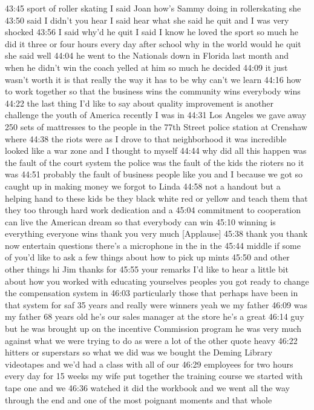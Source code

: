 \documentclass[
]{book}
\begin{document}
43:45
sport of roller skating I said Joan how's Sammy doing in rollerskating she
43:50
said I didn't you hear I said hear what she said he quit and I was very shocked
43:56
I said why'd he quit I said I know he loved the sport so much he did it three or four hours every day after school why in the world would he quit she said well
44:04
he went to the Nationals down in Florida last month and when he didn't win the coach yelled at him so much he decided
44:09
it just wasn't worth it is that really the way it has to be why can't we learn
44:16
how to work together so that the business wins the community wins everybody wins
44:22
the last thing I'd like to say about quality improvement is another challenge the youth of America recently I was in
44:31
Los Angeles we gave away 250 sets of mattresses to the people in the 77th Street police station at Crenshaw where
44:38
the riots were as I drove to that neighborhood it was incredible looked like a war zone and I thought to myself
44:44
why did all this happen was the fault of the court system the police was the fault of the kids the rioters no it was
44:51
probably the fault of business people like you and I because we got so caught up in making money we forgot to Linda
44:58
not a handout but a helping hand to these kids be they black white red or yellow and teach them that they too through hard work dedication and a
45:04
commitment to cooperation can live the American dream so that everybody can win
45:10
winning is everything everyone wins thank you very much {[}Applause{]}
45:38
thank you thank now entertain questions there's a microphone in the in the
45:44
middle if some of you'd like to ask a few things about how to pick up mints
45:50
and other other things hi Jim thanks for
45:55
your remarks I'd like to hear a little bit about how you worked with educating yourselves peoples you got ready to change the compensation system in
46:03
particularly those that perhaps have been in that system for saf 35 years and really were winners yeah we my father
46:09
was my father 68 years old he's our sales manager at the store he's a great
46:14
guy but he was brought up on the incentive Commission program he was very much against what we were trying to do as were a lot of the other quote heavy
46:22
hitters or superstars so what we did was we bought the Deming Library videotapes and we'd had a class with all of our
46:29
employees for two hours every day for 15 weeks my wife put together the training course we started with tape one and we
46:36
watched it did the workbook and we went all the way through the end and one of the most poignant moments and that whole
\end{document}
